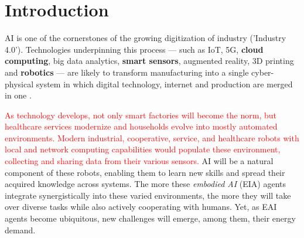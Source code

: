 \section{Introduction}\label{sec:intro}
\begin{fancyquotes}
	AI is one of the cornerstones of the growing digitization of industry ('Industry 4.0'). Technologies underpinning  this  process  ---  such as IoT,  5G,  \textbf{cloud  computing},  big  data  analytics,  \textbf{smart  sensors},  augmented  reality,  3D  printing  and  \textbf{robotics}  ---  are  likely  to  transform  manufacturing  into  a  single cyber-physical  system  in which digital  technology,  internet  and  production  are merged in one \cite{szczepanski_2019}.
\end{fancyquotes}
\textcolor{red}{As technology develops, not only smart factories will become the norm, but healthcare services modernize and households evolve into mostly automated environments. Modern industrial, cooperative, service, and healthcare robots with local and network computing capabilities would populate these environment, collecting and sharing data from their various sensors.} AI will be a natural component of these robots, enabling them to learn new skills and spread their acquired knowledge across systems. The more these \emph{embodied AI} (EIA) agents integrate synergistically into these varied environments, the more they will take over diverse tasks while also actively cooperating with humans. Yet, as EAI agents become ubiquitous, new challenges will emerge, among them, their energy demand.


